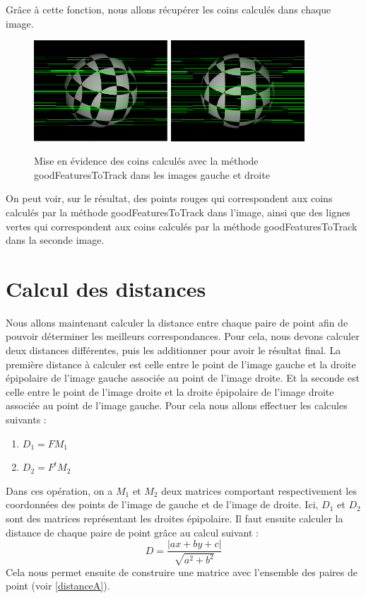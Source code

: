 \documentclass[a4paper,10pt]{article}
\begin{document}
Grâce à cette fonction, nous allons récupérer les coins calculés dans chaque image.
\begin{figure}[!h]
  \center
    \includegraphics[width=5cm]{leftR.png}
    \includegraphics[width=5cm]{rightR.png}
  \caption{Mise en évidence des coins calculés avec la méthode goodFeaturesToTrack dans les images gauche et droite}
\end{figure}
On peut voir, sur le résultat, des points rouges qui correspondent aux coins calculés par la méthode goodFeaturesToTrack
dans l'image, ainsi que des lignes vertes qui correspondent aux coins calculés par la méthode goodFeaturesToTrack dans la
seconde image.
 
\section{Calcul des distances}
Nous allons maintenant calculer la distance entre chaque paire de point afin de pouvoir déterminer
les meilleurs correspondances. Pour cela, nous devons calculer deux distances différentes, puis les 
additionner pour avoir le résultat final. La première distance à calculer est celle entre le point de l'image gauche et la droite épipolaire 
de l'image gauche associée au point de l'image droite. Et la seconde est celle entre le point de l'image droite et la droite épipolaire de 
l'image droite associée au point de l'image gauche. Pour cela nous allons effectuer les calcules suivants :
\begin{enumerate}
 \item $D_1 = FM_1$
 \item $D_2 = F^tM_2$
\end{enumerate}
Dans ces opération, on a $M_1$ et $M_2$ deux matrices comportant respectivement les coordonnées des points 
de l'image de gauche et de l'image de droite. Ici, $D_1$ et $D_2$ sont des matrices représentant les droites
épipolaire. Il faut ensuite calculer la distance de chaque paire de point grâce au calcul suivant :
\begin{equation}
 D = \frac{|ax+by+c|}{\sqrt{a^2+b^2}}
\end{equation}
Cela nous permet ensuite de construire une matrice avec l'ensemble des paires de point (voir \ref{distanceA}).
\end{document}
